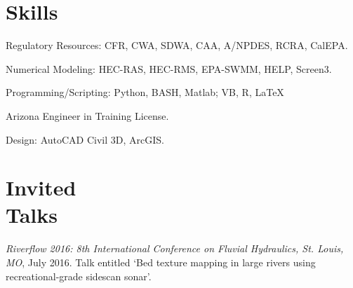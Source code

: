 \documentclass[margin,line]{resume}
\begin{document}
\begin{resume}
\begin{footnotesize}
\begin{list1}
	\end{list1}
        \end{footnotesize}

    \section{\mysidestyle Skills} 
    \begin{footnotesize}
    \begin{list1}
        \item[1] Regulatory Resources: CFR, CWA, SDWA, CAA, A/NPDES, RCRA, CalEPA.\\
        \item[2] Numerical Modeling: HEC-RAS, HEC-RMS, EPA-SWMM, HELP, Screen3.\\
        \item[3] Programming/Scripting: Python, BASH, Matlab; VB, R, \LaTeX\.\\
        \item[4] Arizona Engineer in Training License.\\
        \item[5] Design: AutoCAD Civil 3D, ArcGIS.\\
    \end{list1}
     \end{footnotesize}

 	\section{\mysidestyle Invited \\Talks}
       \begin{footnotesize}
 	\begin{list1}
 	\item[1] {\sl Riverflow 2016: 8th International Conference on Fluvial Hydraulics, St. Louis, MO}, July 2016. Talk entitled `Bed texture mapping in large rivers using recreational-grade sidescan sonar'.\\
 	\end{list1}
        \end{footnotesize}


\end{resume}
\end{document}
